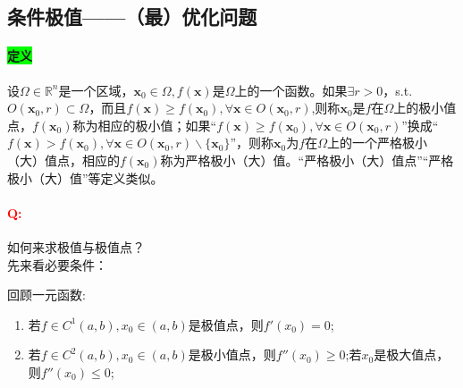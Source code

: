 \documentclass[UTF8]{ctexart}
\begin{document}
    \subsection{条件极值——（最）优化问题}
    \paragraph{\colorbox{lime}{定义}}设$\Omega\in\mathbb{R}^n$是一个区域，$\boldsymbol{x}_0\in\Omega,f(\boldsymbol{x})$是$\Omega$上的一个函数。如果$\exists r>0$，s.t.$O(\boldsymbol{x}_0,r)\subset\Omega$，而且$f(\boldsymbol{x})\ge f(\boldsymbol{x}_0),\forall\boldsymbol{x}\in O(\boldsymbol{x}_0,r)$,则称$\boldsymbol{x}_0$是$f$在$\Omega$上的极小值点，$f(\boldsymbol{x}_0)$称为相应的极小值；如果“$f(\boldsymbol{x})\ge f(\boldsymbol{x}_0),\forall\boldsymbol{x}\in O(\boldsymbol{x}_0,r)$”换成“$f(\boldsymbol{x})> f(\boldsymbol{x}_0),\forall\boldsymbol{x}\in O(\boldsymbol{x}_0,r)\backslash\{\boldsymbol{x}_0\}$”，则称$\boldsymbol{x}_0$为$f$在$\Omega$上的一个严格极小（大）值点，相应的$f(\boldsymbol{x}_0)$称为严格极小（大）值。“严格极小（大）值点”“严格极小（大）值”等定义类似。

    \paragraph{\textcolor{red}{Q:}}如何来求极值与极值点？\\
    先来看必要条件：

    回顾一元函数:\begin{enumerate}
        \item 若$f\in C^1(a,b),x_0\in(a,b)$是极值点，则$f'(x_0)=0$;
        \item 若$f\in C^2(a,b),x_0\in(a,b)$是极小值点，则$f''(x_0)\ge 0$;若$x_0$是极大值点，则$f''(x_0)\le 0$;
    \end{enumerate}
\end{document}

